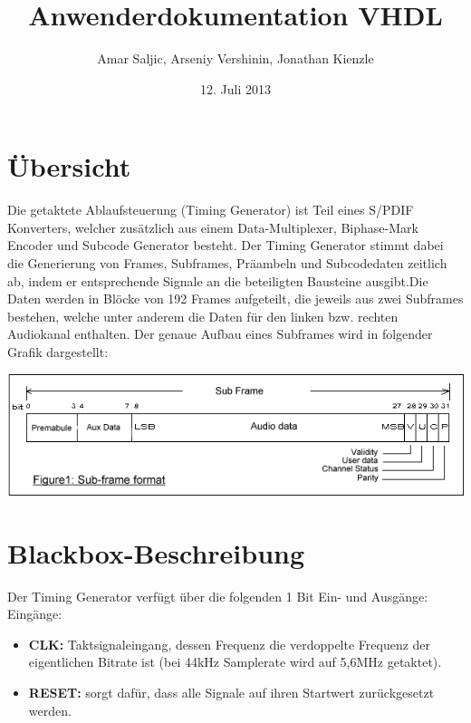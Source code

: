 \documentclass[12pt,a4paper]{article}
\title{Anwenderdokumentation VHDL}
\author{Amar Saljic, Arseniy Vershinin, Jonathan Kienzle}
\date{12. Juli 2013}
\begin{document}
\maketitle

\thispagestyle{fancy}

\section{Übersicht}

Die getaktete Ablaufsteuerung (Timing Generator) ist Teil eines S/PDIF Konverters, welcher zusätzlich aus einem Data-Multiplexer, Biphase-Mark Encoder und Subcode Generator besteht. Der Timing Generator stimmt dabei die Generierung von Frames, Subframes, Präambeln und Subcodedaten zeitlich ab, indem er entsprechende Signale an die beteiligten Bausteine ausgibt.\newline Die Daten werden in Blöcke von 192 Frames aufgeteilt, die jeweils aus zwei Subframes bestehen, welche unter anderem die Daten für den linken bzw. rechten Audiokanal enthalten. Der genaue Aufbau eines Subframes wird in folgender Grafik dargestellt:
\vspace{0.4cm}

\includegraphics[width=18cm]{_fig1.png}\newline
\section{Blackbox-Beschreibung}
Der Timing Generator verfügt über die folgenden 1 Bit Ein- und Ausgänge: \newline \newline
Eingänge:
\begin{itemize}
\item {\bf CLK:} Taktsignaleingang, dessen Frequenz die verdoppelte Frequenz der eigentlichen Bitrate ist (bei 44kHz Samplerate wird auf 5,6MHz getaktet).
\item {\bf RESET:} sorgt dafür, dass alle Signale auf ihren Startwert zurückgesetzt werden.
\end {itemize}
\noindent
\end{document}
